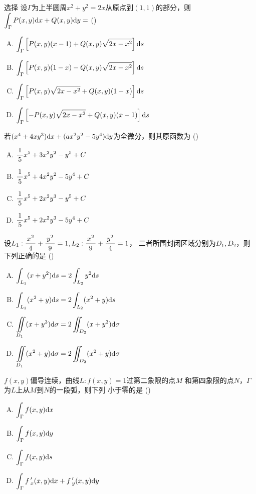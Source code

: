 \begin{frame}{选择}
	\linespread{1.5}
	设$\Gamma$为上半圆周$x^2+y^2=2x$从原点到$(1,1)$的部分，则
  	$\displaystyle\int_{\Gamma}P(x,y)\mathrm{d} x+Q(x,y)\mathrm{d} y=$
	(\underline{\;})
	\begin{enumerate}[(A)]
	  \item $\displaystyle\int_{\Gamma}\left[P(x,y)(x-1)+Q(x,y)\sqrt{2x-x^2}\right]\mathrm{d} s$
      \item $\displaystyle\int_{\Gamma}\left[P(x,y)(1-x)-Q(x,y)\sqrt{2x-x^2}\right]\mathrm{d} s$
      \item $\displaystyle\int_{\Gamma}\left[P(x,y)\sqrt{2x-x^2}+Q(x,y)(1-x)\right]\mathrm{d} s$
      \item $\displaystyle\int_{\Gamma}\left[-P(x,y)\sqrt{2x-x^2}+Q(x,y)(x-1)\right]\mathrm{d} s$
	\end{enumerate}
\end{frame}

\begin{frame}
	\linespread{1.5}
	若$(x^4+4xy^3)\mathrm{d} x+(ax^2y^2-5y^4)\mathrm{d} y$为全微分，则其原函数为
	(\underline{\;})
	\begin{enumerate}[(A)]
	  \item $\displaystyle\frac{\,{1}\,}{\,{5}\,}x^5+3x^2y^2-y^5+C$
      \item $\displaystyle\frac{\,{1}\,}{\,{5}\,}x^5+4x^2y^2-5y^4+C$
      \item $\displaystyle\frac{\,{1}\,}{\,{5}\,}x^5+2x^2y^3-y^5+C$
      \item $\displaystyle\frac{\,{1}\,}{\,{5}\,}x^5+2x^2y^3-5y^4+C$
	\end{enumerate}
\end{frame}

\begin{frame}
	\linespread{1.5}
	设$L_1:\displaystyle\frac{\,{x^2}\,}{\,{4}\,}+\displaystyle\frac{\,{y^2}\,}{\,{9}\,}=1,L_2:
	\displaystyle\frac{\,{x^2}\,}{\,{9}\,}+\displaystyle\frac{\,{y^2}\,}{\,{4}\,}=1$，
	二者所围封闭区域分别为$D_1,D_2$，则下列正确的是
	(\underline{\;})
	\begin{enumerate}[(A)]
	  \item $\displaystyle\int_{L_1}(x+y^2)\mathrm{d} s=2\displaystyle\int_{L_2}y^2\mathrm{d} s$
	  \item $\displaystyle\int_{L_1}(x^2+y)\mathrm{d} s=2\displaystyle\int_{L_2}(x^2+y)\mathrm{d} s$
	  \item $\displaystyle\iint\limits_{D_1}(x+y^3)\mathrm{d}\sigma=2\displaystyle\iint_{D_2}(x+y^3)\mathrm{d}\sigma$
	  \item $\displaystyle\iint\limits_{D_1}(x^2+y)\mathrm{d}\sigma=2\displaystyle\iint_{D_2}(x^2+y)\mathrm{d}\sigma$
	\end{enumerate}
\end{frame}

\begin{frame}
	\linespread{1.5}
	$f(x,y)$偏导连续，曲线$L:f(x,y)=1$过第二象限的点$M$
	  和第四象限的点$N$，$\Gamma$为$L$上从$M$到$N$的一段弧，则下列
	  小于零的是
	(\underline{\;})
	\begin{enumerate}[(A)]
	  \item $\displaystyle\int_{\Gamma}f(x,y)\mathrm{d} x$
	  \item $\displaystyle\int_{\Gamma}f(x,y)\mathrm{d} y$
	  \item $\displaystyle\int_{\Gamma}f(x,y)\mathrm{d} s$
	  \item $\displaystyle\int_{\Gamma}f\,'_x(x,y)\mathrm{d} x+f\,'_y(x,y)\mathrm{d} y$
	\end{enumerate}
\end{frame}

